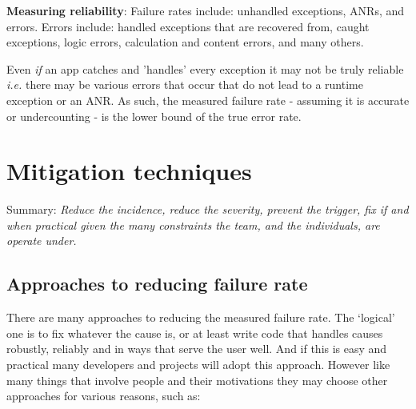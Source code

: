
\textbf{Measuring reliability}: 
Failure rates include: unhandled exceptions, ANRs, and errors. Errors include: handled exceptions that are recovered from, caught exceptions, logic errors, calculation and content errors, and many others. 

Even \textit{if} an app catches and 'handles' every exception it may not be truly reliable \textit{i.e.} there may be various errors that occur that do not lead to a runtime exception or an ANR. As such, the measured failure rate - assuming it is accurate or undercounting - is the lower bound of the true error rate.

\section{Mitigation techniques}
Summary: \textit{Reduce the incidence, reduce the severity, prevent the trigger, fix if and when practical given the many constraints the team, and the individuals,  are operate under.}

\subsection{Approaches to reducing failure rate}
There are many approaches to reducing the measured failure rate. The `logical' one is to fix whatever the cause is, or at least write code that handles causes robustly, reliably and in ways that serve the user well. And if this is easy and practical many developers and projects will adopt this approach. However like many things that involve people and their motivations they may choose other approaches for various reasons, such as:

